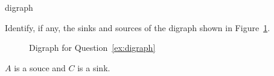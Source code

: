 \begin{defproblem}{digraph}
  \begin{onlyproblem}\label{ex:digraph}
  Identify, if any, the sinks and sources of the digraph shown in Figure~\ref{fig:digraph}. 

  \begin{figure}[tbh]
    \centering
    \par
    \caption{Digraph for Question~\ref{ex:digraph}}
    \label{fig:digraph}
  \end{figure}
  \end{onlyproblem}
  \begin{onlysolution}
  $A$ is a souce and $C$ is a sink.
  \end{onlysolution}
\end{defproblem}
